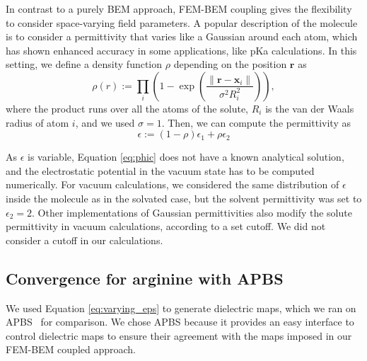 In contrast to a purely BEM approach, FEM-BEM coupling gives the flexibility to consider space-varying field parameters. 
A popular description of the molecule is to consider a permittivity that varies like a Gaussian around each atom,\cite{grant2001smooth} which has shown enhanced accuracy in some applications, like pKa calculations.\cite{li2013dielectric}
In this setting, we define a density function $\rho$ depending on the position $\mathbf{r}$ as
%
\begin{equation}
\rho(r) := \prod_i \left(1 - \exp{\left(\frac{\|\mathbf{r}-\mathbf{x}_i\|}{\sigma^2 R_i^2}\right)}\right),
\end{equation}
%
where the product runs over all the atoms of the solute, $R_i$ is the van der Waals radius of atom $i$, and we used $\sigma=1$. Then, we can compute the permittivity as
%
\begin{equation}\label{eq:varying_eps}
\epsilon := \left(1-\rho \right) \epsilon_1 + \rho\epsilon_2
\end{equation}

As $\epsilon$ is variable, Equation \eqref{eq:phic} does not have a known analytical solution, and the electrostatic potential in the vacuum state has to be computed numerically.
For vacuum calculations, we considered the same distribution of $\epsilon$ inside the molecule as in the solvated case, but the solvent permittivity was set to $\epsilon_2=2$. 
Other implementations of Gaussian permittivities also modify the solute permittivity in vacuum calculations, according to a set cutoff.\cite{li2013dielectric} We did not consider a cutoff in our calculations.

\subsection*{\sffamily \large Convergence for arginine with APBS}

We used Equation \eqref{eq:varying_eps} to generate dielectric maps, which we ran on APBS~\cite{BakerETal2001} for comparison. 
We chose APBS because it provides an easy interface to control dielectric maps to ensure their agreement with the maps imposed in our FEM-BEM coupled approach.


